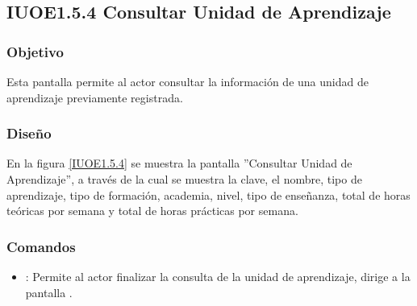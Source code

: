 \subsection{IUOE1.5.4 Consultar Unidad de Aprendizaje}

\subsubsection{Objetivo}
	Esta pantalla permite al actor consultar la información de una unidad de aprendizaje previamente registrada.

\subsubsection{Diseño}
	En la figura \ref{IUOE1.5.4} se muestra la pantalla ''Consultar Unidad de Aprendizaje'', a través de la cual se muestra la clave, el nombre, tipo de aprendizaje, tipo de formación, academia, nivel, tipo de enseñanza, total de horas teóricas por semana y total de horas prácticas por semana.


\subsubsection{Comandos}
\begin{itemize}
	\item {}: Permite al actor finalizar la consulta de la unidad de aprendizaje, dirige a la pantalla .

\end{itemize}
